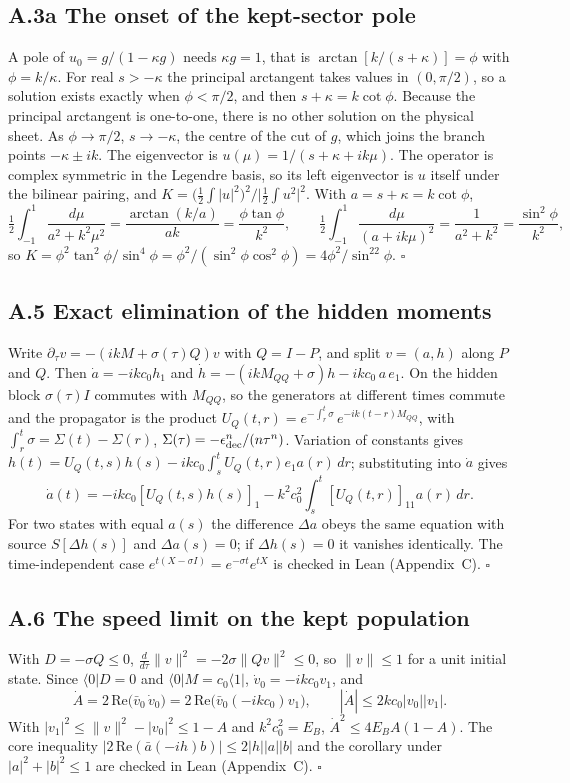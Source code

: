 \documentclass[11pt]{article}
\begin{document}
\subsection*{A.3a The onset of the kept-sector pole}
A pole of $u_0=g/(1-\kappa g)$ needs $\kappa g=1$, that is $\arctan[k/(s+\kappa)]=\phi$ with $\phi=k/\kappa$. For real $s>-\kappa$ the principal arctangent takes values in $(0,\pi/2)$, so a solution exists exactly when $\phi<\pi/2$, and then $s+\kappa=k\cot\phi$. Because the principal arctangent is one-to-one, there is no other solution on the physical sheet. As $\phi\to\pi/2$, $s\to-\kappa$, the centre of the cut of $g$, which joins the branch points $-\kappa\pm ik$. The eigenvector is $u(\mu)=1/(s+\kappa+ik\mu)$. The operator is complex symmetric in the Legendre basis, so its left eigenvector is $u$ itself under the bilinear pairing, and $K=\big(\tfrac12\!\int|u|^2\big)^2/\big|\tfrac12\!\int u^2\big|^2$. With $a=s+\kappa=k\cot\phi$,
\[
\tfrac12\int_{-1}^{1}\frac{d\mu}{a^2+k^2\mu^2}=\frac{\arctan(k/a)}{ak}=\frac{\phi\tan\phi}{k^2},\qquad
\tfrac12\int_{-1}^{1}\frac{d\mu}{(a+ik\mu)^2}=\frac{1}{a^2+k^2}=\frac{\sin^2\phi}{k^2},
\]
so $K=\phi^2\tan^2\phi/\sin^4\phi=\phi^2/(\sin^2\phi\cos^2\phi)=4\phi^2/\sin^22\phi$. $\square$

\subsection*{A.5 Exact elimination of the hidden moments}
Write $\partial_\tau v=-(ikM+\sigma(\tau)Q)v$ with $Q=I-P$, and split $v=(a,h)$ along $P$ and $Q$. Then $\dot a=-ikc_0h_1$ and $\dot h=-(ikM_{QQ}+\sigma)h-ikc_0\,a\,e_1$. On the hidden block $\sigma(\tau)I$ commutes with $M_{QQ}$, so the generators at different times commute and the propagator is the product $U_Q(t,r)=e^{-\int_r^t\sigma}\,e^{-ik(t-r)M_{QQ}}$, with $\int_r^t\sigma=\Sigma(t)-\Sigma(r)$, $\Sigma(\tau)=-\epsilon_{\rm dec}^n/(n\tau^n)$. Variation of constants gives $h(t)=U_Q(t,s)h(s)-ikc_0\int_s^tU_Q(t,r)e_1a(r)\,dr$; substituting into $\dot a$ gives
\[
\dot a(t)=-ikc_0[U_Q(t,s)h(s)]_1-k^2c_0^2\int_s^t[U_Q(t,r)]_{11}a(r)\,dr .
\]
For two states with equal $a(s)$ the difference $\Delta a$ obeys the same equation with source $S[\Delta h(s)]$ and $\Delta a(s)=0$; if $\Delta h(s)=0$ it vanishes identically. The time-independent case $e^{t(X-\sigma I)}=e^{-\sigma t}e^{tX}$ is checked in Lean (Appendix~C). $\square$
\subsection*{A.6 The speed limit on the kept population}
With $D=-\sigma Q\le0$, $\frac{d}{d\tau}\lVert v\rVert^2=-2\sigma\lVert Qv\rVert^2\le0$, so $\lVert v\rVert\le1$ for a unit initial state. Since $\langle0|D=0$ and $\langle0|M=c_0\langle1|$, $\dot v_0=-ikc_0v_1$, and
\[
\dot A=2\,\mathrm{Re}\big(\bar v_0\,\dot v_0\big)=2\,\mathrm{Re}\big(\bar v_0(-ikc_0)v_1\big),\qquad |\dot A|\le2kc_0|v_0||v_1|.
\]
With $|v_1|^2\le\lVert v\rVert^2-|v_0|^2\le1-A$ and $k^2c_0^2=E_B$, $\dot A^2\le4E_BA(1-A)$. The core inequality $|2\,\mathrm{Re}(\bar a(-ih)b)|\le2|h||a||b|$ and the corollary under $|a|^2+|b|^2\le1$ are checked in Lean (Appendix~C). $\square$
\end{document}
